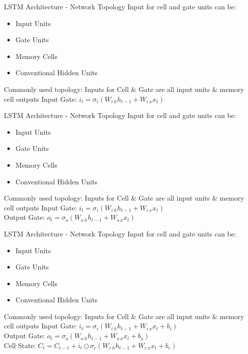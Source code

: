 \documentclass[10pt, aspectratio=169]{beamer}
\begin{document}
\begin{frame}[t]{LSTM Architecture - Network Topology}
Input for cell and gate units can be:
\begin{itemize}
    \item Input Units
    \item Gate Units
    \item Memory Cells
    \item Conventional Hidden Units
\end{itemize}
Commonly used topology: Inputs for Cell \& Gate are all input units \& memory cell outputs
Input Gate: \begin{math}i_t=\sigma_i\left(W_{i\ h}h_{t-1}+W_{i\ x} x_t\right)\end{math}
\end{frame}

\begin{frame}[t]{LSTM Architecture - Network Topology}
Input for cell and gate units can be:
\begin{itemize}
    \item Input Units
    \item Gate Units
    \item Memory Cells
    \item Conventional Hidden Units
\end{itemize}
Commonly used topology: Inputs for Cell \& Gate are all input units \& memory cell outputs
Input Gate:  \begin{math}i_t=\sigma_i\left(W_{i\ h}h_{t-1}+W_{i\ x} x_t\right)\end{math}\\
Output Gate: \begin{math}o_t=\sigma_o\left(W_{o\ h}h_{t-1}+W_{o\ x}x_t\right)\end{math}
\end{frame}

\begin{frame}[t]{LSTM Architecture - Network Topology}
Input for cell and gate units can be:
\begin{itemize}
    \item Input Units
    \item Gate Units
    \item Memory Cells
    \item Conventional Hidden Units
\end{itemize}
Commonly used topology: Inputs for Cell \& Gate are all input units \& memory cell outputs
Input Gate:  \begin{math}i_t=\sigma_i\left(W_{i\ h}h_{t-1}+W_{i\ x} x_t + b_i\right)\end{math}\\
Output Gate: \begin{math}o_t=\sigma_o\left(W_{o\ h}h_{t-1}+W_{o\ x}x_t + b_o\right)\end{math}\\
Cell State: \begin{math}C_t=C_{t-1}+i_t\odot\sigma_c\left(W_{c\ h}h_{t-1}+W_{c\ x}x_t + b_c\right)\end{math} 
\end{frame}
\end{document}
